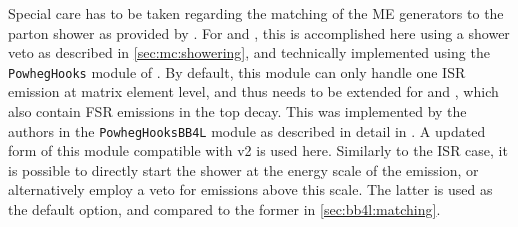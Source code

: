 Special care has to be taken regarding the matching of the \powheg ME generators to the parton shower as provided by \pythia.  %
For \hvq and \ST, this is accomplished here using a shower veto as described in \cref{sec:mc:showering}, and technically implemented using the \texttt{PowhegHooks} module of \pythia. By default, this module can only handle one ISR emission at matrix element level, and thus needs to be extended for \bbfourl and \ttb, which also contain FSR emissions in the top decay. This was implemented by the \bbfourl authors in the \texttt{PowhegHooksBB4L} module as described in detail in . A updated form of this module compatible with \bbfourl v2 is used here. Similarly to the ISR case, it is possible to directly start the shower at the energy scale of the \powheg emission, or alternatively employ a veto for emissions above this scale. The latter is used as the default option, and compared to the former in \cref{sec:bb4l:matching}.




